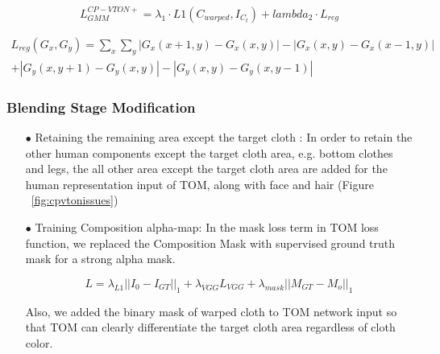 \begin{itemize}


\begin{equation}
 L_{GMM}^{CP-VTON+}  = \lambda_1 \cdot L1(C_{warped}, I_{C_t}) + lambda_2 \cdot  L_{reg}  
\end{equation}

\begin{equation}\label{eq:gridloss}
\begin{aligned}
 L_{reg} (G_x, G_y) = \sum_x \sum_y | G_x(x+1, y) - G_x(x, y) | - | G_x(x, y) - G_x(x-1, y) | \\
 + | G_y(x, y+1) - G_y(x, y) | - | G_y(x, y) - G_y(x, y-1) |
\end{aligned}
\end{equation}


\end{itemize}

\subsubsection{Blending Stage Modification }


\begin{itemize}

\item[$\bullet$] Retaining the remaining area except the target cloth  :
In order to retain the other human components except the target cloth area, e.g. bottom clothes and legs, the all other area except the target cloth area are added for the human representation input of TOM, along with face and hair (Figure ~\ref{fig:cpvtonissues})

\item[$\bullet$] Training Composition alpha-map:  
In the mask loss term in TOM loss function, we replaced the Composition Mask with supervised ground truth mask for a strong alpha mask.

\begin{equation}
L = \lambda_{L1} || I_0-I_{GT}||_1+  \lambda_{VGG} L_{VGG} + \lambda_{mask} ||M_{GT}-M_o||_1       
\end{equation}

Also, we added the binary mask of warped cloth to TOM network input so that TOM can clearly differentiate the target cloth area regardless of cloth color.  

\end{itemize}

